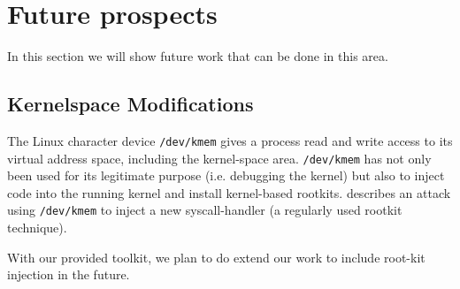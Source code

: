 %
%

\section{Future prospects}

\label{prospects}

In this section we will show future work that can be done in this area.

\subsection{Kernelspace Modifications}

The Linux character device \texttt{/dev/kmem} gives a process read and write
access to its virtual address space, including the kernel-space area.
\texttt{/dev/kmem} has not only been used for its legitimate purpose (i.e\@.
debugging the kernel) but also to inject code into the running kernel and
install kernel-based rootkits. \cite{phrack58.7:2001} describes an attack using
\texttt{/dev/kmem} to inject a new syscall-handler (a regularly used rootkit
technique).

With our provided toolkit, we plan to do extend our work to include root-kit
injection in the future.

%
%

